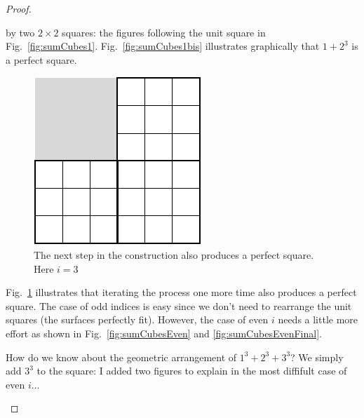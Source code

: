 \begin{proof}
\begin{description}
 by two $2 \times 2$ squares: the figures following the unit square in
Fig.~\ref{fig:sumCubes1}.
Fig.~\ref{fig:sumCubes1bis} illustrates graphically that $1+ 2^3$
is a perfect square.
\begin{figure}[ht]
\begin{center}
       \includegraphics[scale=0.4]{FiguresMaths/SumCubes3}
\caption{The next step in the construction also produces a perfect square. Here $i=3$}
       \label{fig:sumCubes3}
\end{center}
\end{figure}
Fig.~\ref{fig:sumCubes3} illustrates that iterating the process one more time also
produces a perfect square. 
The case of odd indices is easy since we don't need to rearrange the unit squares 
(the surfaces perfectly fit).
However, the case of even $i$ needs a little more effort as shown in Fig.~\ref{fig:sumCubesEven}
and \ref{fig:sumCubesEvenFinal}.

{\Arny How do we know about the geometric arrangement of $1^3 + 2^3 + 3^3$?}
{\Denis We simply add $3^3$ to the square: I added two figures to explain in the most diffifult case of even $i$...}


\end{description}
\end{proof}
